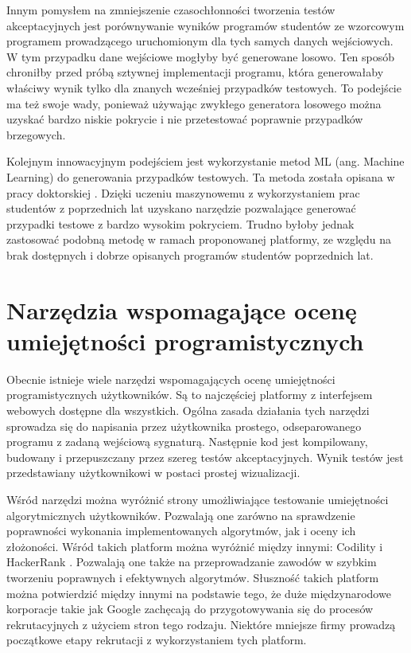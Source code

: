 Innym pomysłem na zmniejszenie czasochłonności tworzenia testów akceptacyjnych jest porównywanie wyników programów studentów ze wzorcowym programem prowadzącego uruchomionym dla tych samych danych wejściowych.
W tym przypadku dane wejściowe mogłyby być generowane losowo.
Ten sposób chroniłby przed próbą sztywnej implementacji programu, która generowałaby właściwy wynik tylko dla znanych wcześniej przypadków testowych.
To podejście ma też swoje wady, ponieważ używając zwykłego generatora losowego można uzyskać bardzo niskie pokrycie i nie przetestować poprawnie przypadków brzegowych.

Kolejnym innowacyjnym podejściem jest wykorzystanie metod ML (ang. Machine Learning) do generowania przypadków testowych. 
Ta metoda została opisana w pracy doktorskiej \cite{teach-testing-thesis}. 
Dzięki uczeniu maszynowemu z wykorzystaniem prac studentów z poprzednich lat uzyskano narzędzie pozwalające generować przypadki testowe z bardzo wysokim pokryciem.
Trudno byłoby jednak zastosować podobną metodę w ramach proponowanej platformy, ze względu na brak dostępnych i dobrze opisanych programów studentów poprzednich lat.




\section{Narzędzia wspomagające ocenę umiejętności programistycznych}
\label{tools}

Obecnie istnieje wiele narzędzi wspomagających ocenę umiejętności programistycznych użytkowników.
Są to najczęściej platformy z interfejsem webowych dostępne dla wszystkich.
Ogólna zasada działania tych narzędzi sprowadza się do napisania przez użytkownika prostego, odseparowanego programu z zadaną wejściową sygnaturą.
Następnie kod jest kompilowany, budowany i przepuszczany przez szereg testów akceptacyjnych.
Wynik testów jest przedstawiany użytkownikowi w postaci prostej wizualizacji.

Wśród narzędzi można wyróżnić strony umożliwiające testowanie umiejętności algorytmicznych użytkowników.
Pozwalają one zarówno na sprawdzenie poprawności wykonania implementowanych algorytmów, jak i oceny ich złożoności.
Wśród takich platform można wyróżnić między innymi: Codility \cite{codility} i HackerRank \cite{hacker-rank}. 
Pozwalają one także na przeprowadzanie zawodów w szybkim tworzeniu poprawnych i efektywnych algorytmów. 
Słuszność takich platform można potwierdzić między innymi na podstawie tego, że duże międzynarodowe korporacje takie jak Google zachęcają do przygotowywania się do procesów rekrutacyjnych z użyciem stron tego rodzaju. 
Niektóre mniejsze firmy prowadzą początkowe etapy rekrutacji z wykorzystaniem tych platform.

